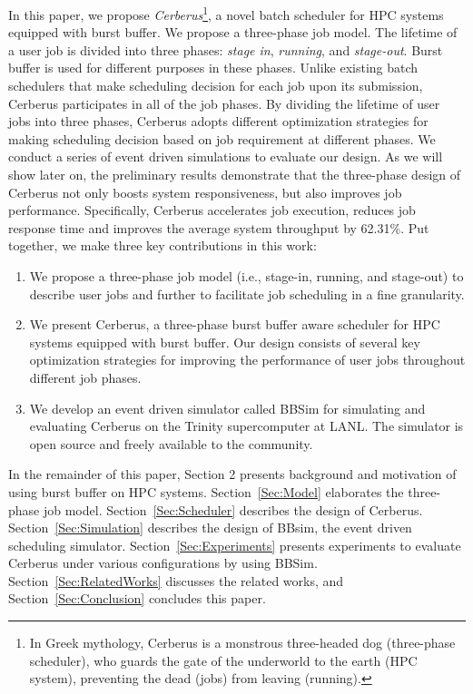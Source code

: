 In this paper, we propose \textit{Cerberus}\footnote{In Greek mythology,
Cerberus is a monstrous three-headed dog (three-phase scheduler),
who guards the gate of the underworld to the earth (HPC system),
preventing the dead (jobs) from leaving (running).},
a novel batch scheduler for HPC systems equipped with burst buffer. 
We propose a three-phase job model.
The lifetime of a user job is divided into three phases:
\textit{stage in}, \textit{running}, and \textit{stage-out}.
Burst buffer is used for different purposes in these phases.
Unlike existing batch schedulers that make scheduling decision for each job upon its submission,
Cerberus participates in all of the job phases.
By dividing the lifetime of user jobs into three phases,
Cerberus adopts different optimization strategies for 
making scheduling decision based on job requirement at different phases. 
We conduct a series of event driven simulations to evaluate our design. 
As we will show later on, 
the preliminary results demonstrate that the three-phase design of Cerberus 
not only boosts system responsiveness, but also improves job performance. 
Specifically,
Cerberus accelerates job execution, reduces job response time 
and improves the average system throughput by 62.31\%.
Put together, we make three key contributions in this work:
\begin{enumerate}
        \item    We propose a three-phase job model (i.e., stage-in, running, and stage-out) 
        to describe user jobs and further to facilitate job scheduling in a fine granularity.
        
        \item    We present Cerberus, 
        a three-phase burst buffer aware scheduler for HPC systems equipped with burst buffer. 
        Our design consists of several key optimization strategies for 
        improving the performance of user jobs throughout different job phases.
        
        \item    We develop an event driven simulator called BBSim 
        for simulating and evaluating Cerberus on the Trinity 
        supercomputer at LANL\cite{TrinitySystem}. 
        The simulator is open source and freely available to the community\cite{bbsim-github}.
\end{enumerate}


In the remainder of this paper, Section 2 presents background and 
motivation of using burst buffer on HPC systems.
Section~\ref{Sec:Model} elaborates the three-phase job model.
Section~\ref{Sec:Scheduler} describes the design of Cerberus.
Section~\ref{Sec:Simulation} describes the design of BBsim, the event driven scheduling simulator.
Section~\ref{Sec:Experiments} presents experiments to evaluate Cerberus under various configurations by using BBSim.
Section~\ref{Sec:RelatedWorks} discusses the related works, 
and Section~\ref{Sec:Conclusion} concludes this paper.


